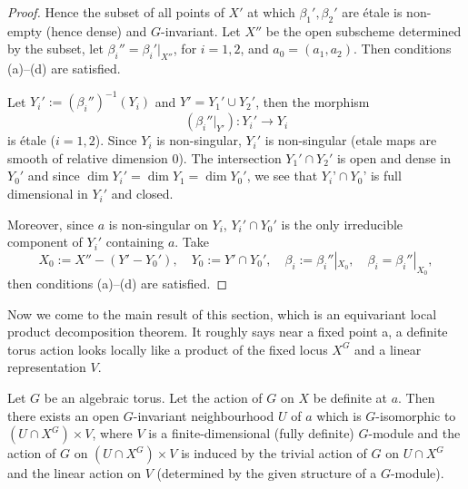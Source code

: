 \documentclass[12pt]{article}
\begin{document}
\begin{proof}
Hence the subset of all points of $X'$ at which $\beta_1', \beta_2'$ are \'etale is non-empty (hence dense) and $G$-invariant. Let $X''$ be the open subscheme determined by the subset, let $\beta_i'' = \beta_i'|_{X''}$, for $i=1,2$, and $a_0=(a_1,a_2)$. Then conditions (a)--(d) are satisfied.

\medskip

Let $Y_i' := (\beta_i'')^{-1}(Y_i)$ and $Y' = Y_1' \cup Y_2'$, then the morphism 
\[
   (\beta_i''|_{Y'}) : Y_i' \to Y_i
\]
is \'etale ($i=1,2$). Since $Y_i$ is non-singular, $Y_i'$ is non-singular (etale maps are smooth of relative dimension 0). The intersection $Y_1' \cap Y_2'$ is open and dense in $Y_0'$ and since $\dim Y_i' = \dim Y_1 = \dim Y_0'$, we see that $Y_i’ \cap Y_0’$ is full dimensional in $Y_i'$ and closed. 

Moreover, since $a$ is non-singular on $Y_i$, $Y_i'\cap Y_0'$ is the only irreducible component of $Y_i'$ containing $a$. Take
\[
   X_0 := X'' - (Y' - Y_0'), \quad Y_0 := Y' \cap Y_0', \quad \beta_i := \beta_i''|_{X_0}, \quad \beta_i = \beta_i''|_{X_0},
\]
then conditions (a)--(d) are satisfied.
\end{proof}

Now we come to the main result of this section, which is an equivariant local product decomposition theorem. It roughly says near a fixed point a, a definite torus action looks locally like a product of the fixed locus $X^G$ and a linear representation $V$. 


\begin{theorem}[2.5]
Let $G$ be an algebraic torus. Let the action of $G$ on $X$ be definite at $a$. Then there exists an open $G$-invariant neighbourhood $U$ of $a$ which is $G$-isomorphic to $(U \cap X^G) \times V$, where $V$ is a finite-dimensional (fully definite) $G$-module and the action of $G$ on $(U \cap X^G) \times V$ is induced by the trivial action of $G$ on $U \cap X^G$ and the linear action on $V$ (determined by the given structure of a $G$-module).
\end{theorem}
\end{document}
